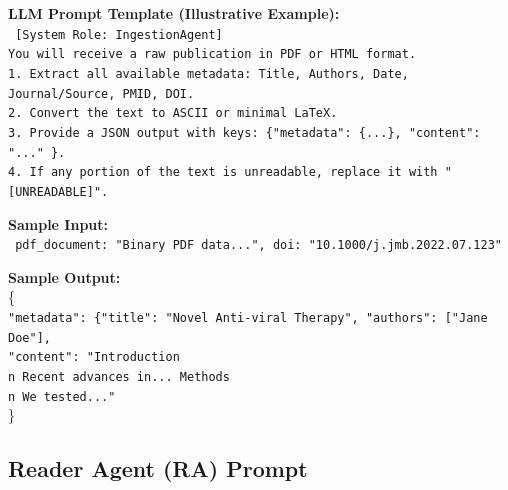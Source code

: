\documentclass{article}
\begin{document}
\begin{tcolorbox}[colframe=black!25, colback=black!5, boxrule=0.5pt, arc=2pt]
\vspace{1mm}
\noindent
\textbf{LLM Prompt Template (Illustrative Example):}\\
\texttt{
[System Role: IngestionAgent]\\
You will receive a raw publication in PDF or HTML format.\\
1. Extract all available metadata: Title, Authors, Date, Journal/Source, PMID, DOI.\\
2. Convert the text to ASCII or minimal LaTeX.\\
3. Provide a JSON output with keys: \{"metadata": \{...\}, "content": "..." \}.\\
4. If any portion of the text is unreadable, replace it with "[UNREADABLE]".\\
}

\vspace{1mm}
\noindent
\textbf{Sample Input:}\\
\texttt{
pdf\_document: "Binary PDF data...", doi: "10.1000/j.jmb.2022.07.123"\\
}

\vspace{1mm}
\noindent
\textbf{Sample Output:}\\
\{\\
\quad \texttt{"metadata": \{"title": "Novel Anti-viral Therapy", "authors": ["Jane Doe"],}\\
\quad \texttt{"content": "Introduction\\n Recent advances in... Methods\\n We tested..."}\\
\}
\end{tcolorbox}
\newpage

\subsection{Reader Agent (RA) Prompt}
\label{appendix:ra_prompt}
\end{document}
